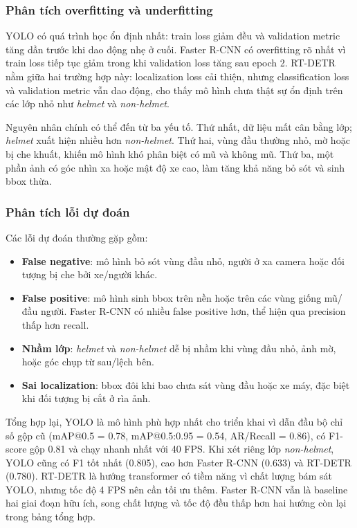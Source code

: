 \subsubsection{Phân tích overfitting và underfitting}

YOLO có quá trình học ổn định nhất: train loss giảm đều và validation metric tăng dần trước khi dao động nhẹ ở cuối. Faster R-CNN có overfitting rõ nhất vì train loss tiếp tục giảm trong khi validation loss tăng sau epoch 2. RT-DETR nằm giữa hai trường hợp này: localization loss cải thiện, nhưng classification loss và validation metric vẫn dao động, cho thấy mô hình chưa thật sự ổn định trên các lớp nhỏ như \textit{helmet} và \textit{non-helmet}.

Nguyên nhân chính có thể đến từ ba yếu tố. Thứ nhất, dữ liệu mất cân bằng lớp; \textit{helmet} xuất hiện nhiều hơn \textit{non-helmet}. Thứ hai, vùng đầu thường nhỏ, mờ hoặc bị che khuất, khiến mô hình khó phân biệt có mũ và không mũ. Thứ ba, một phần ảnh có góc nhìn xa hoặc mật độ xe cao, làm tăng khả năng bỏ sót và sinh bbox thừa.

\subsubsection{Phân tích lỗi dự đoán}

Các lỗi dự đoán thường gặp gồm:

\begin{itemize}
    \item \textbf{False negative}: mô hình bỏ sót vùng đầu nhỏ, người ở xa camera hoặc đối tượng bị che bởi xe/người khác.
    \item \textbf{False positive}: mô hình sinh bbox trên nền hoặc trên các vùng giống mũ/đầu người. Faster R-CNN có nhiều false positive hơn, thể hiện qua precision thấp hơn recall.
    \item \textbf{Nhầm lớp}: \textit{helmet} và \textit{non-helmet} dễ bị nhầm khi vùng đầu nhỏ, ảnh mờ, hoặc góc chụp từ sau/lệch bên.
    \item \textbf{Sai localization}: bbox đôi khi bao chưa sát vùng đầu hoặc xe máy, đặc biệt khi đối tượng bị cắt ở rìa ảnh.
\end{itemize}

Tổng hợp lại, YOLO là mô hình phù hợp nhất cho triển khai vì dẫn đầu bộ chỉ số gộp cũ (mAP@0.5 = 0.78, mAP@0.5:0.95 = 0.54, AR/Recall = 0.86), có F1-score gộp 0.81 và chạy nhanh nhất với 40 FPS. Khi xét riêng lớp \textit{non-helmet}, YOLO cũng có F1 tốt nhất (0.805), cao hơn Faster R-CNN (0.633) và RT-DETR (0.780). RT-DETR là hướng transformer có tiềm năng vì chất lượng bám sát YOLO, nhưng tốc độ 4 FPS nên cần tối ưu thêm. Faster R-CNN vẫn là baseline hai giai đoạn hữu ích, song chất lượng và tốc độ đều thấp hơn hai hướng còn lại trong bảng tổng hợp.

